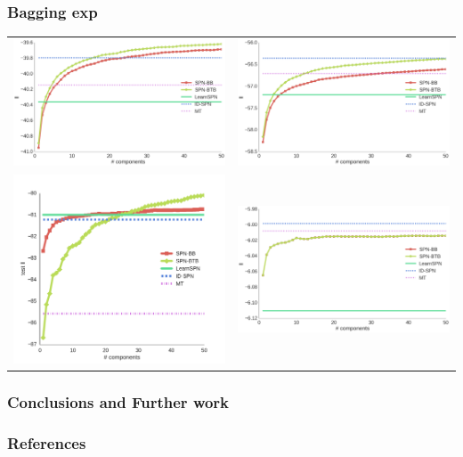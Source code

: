 \documentclass[xcolor={usenames,dvipsnames,svgnames}, compress]{beamer}
\begin{document}
\begin{frame}
  \frametitle{Bagging exp}
  \begin{table}[ht]
    \centering
    \begin{tabular}[t]{c c}
      \includegraphics[width=0.4\linewidth]{figures/curves/baudio}&\includegraphics[width=0.4\linewidth]{figures/curves/bnetflix}\\
      \includegraphics[width=0.4\linewidth]{figures/curves/dna}&\includegraphics[width=0.4\linewidth]{figures/curves/nltcs}\\
    \end{tabular}
  \end{table}
\end{frame}

\begin{frame}
  \frametitle{Conclusions and Further work}
\end{frame}

\begin{frame}
  \frametitle{References}
  \setlength\bibitemsep{8pt}
  \printbibliography
\end{frame}
\end{document}

